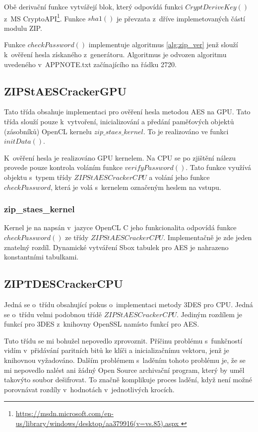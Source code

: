 Obě derivační funkce vytvářejí blok, který odpovídá funkci $CryptDeriveKey()$ z~MS
CryptoAPI\footnote{\url{https://msdn.microsoft.com/en-us/library/windows/desktop/aa379916(v=vs.85).aspx
}}. Funkce $sha1()$ je převzata z~dříve implemetovaných částí modulu ZIP.

 Funkce $checkPassword()$ implementuje algoritmus \ref{alg:zip_ver} jenž slouží k~ověření hesla
získaného z~generátoru. Algoritmus je odvozen algoritmu uvedeného v~APPNOTE.txt začínajícího na
řádku 2720.

\subsection{ZIPStAESCrackerGPU}
Tato třída obsahuje implementaci pro ověření hesla metodou AES na GPU. Tato třída slouží pouze
k~vytvoření, inicializování a předání paměťových objektů (zásobníků) OpenCL kernelu
$zip\_staes\_kernel$. To je realizováno ve funkci $initData()$. 

 K~ověření hesla je realizováno GPU kernelem. Na CPU se po zjištění nálezu provede pouze
kontrola voláním funkce $verifyPassword()$. Tato funkce využívá objektu s~typem třídy
$ZIPStAESCrackerCPU$ a volání jeho funkce $checkPassword$, která je volá s~kernelem označeným
heslem na vstupu.

\subsubsection{zip\_staes\_kernel}
Kernel je na napsán v~jazyce OpenCL C jeho funkcionalita odpovídá funkce $checkPassword()$ ze
třídy $ZIPStAESCrackerCPU$. Implementačně je zde jeden znatelný rozdíl. Dynamické vytváření Sbox
tabulek pro AES je nahrazeno konstantními tabulkami.
 
\subsection{ZIPTDESCrackerCPU}
Jedná se o~třídu obsahující pokus o~implementaci metody 3DES pro CPU. Jedná se o~třídu velmi
podobnou třídě $ZIPStAESCrackerCPU$. Jediným rozdílem je funkcí pro 3DES z~knihovny OpenSSL
namísto funkcí pro AES.

 Tuto třídu se mi bohužel nepovedlo zprovoznit. Příčinu problému s~funkčností vidím v~přidávání
paritních bitů ke klíči a inicializačnímu vektoru, jenž je knihovnou vyžadováno. Dalším
problémem s~laděním tohoto problému je, že se mi nepovedlo nalést ani žádný Open Source
archivační program, který by uměl takovýto soubor dešifrovat. To značně komplikuje proces ladění,
když není možné porovnávat rozdíly v~hodnotách v~jednotlivých krocích.


